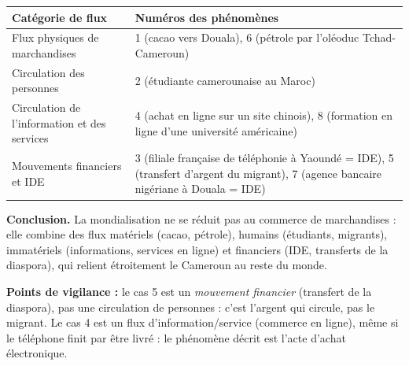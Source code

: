 \documentclass[11pt]{article}
\begin{document}
\begin{corrige}
\begin{center}
\begin{tabularx}{\linewidth}{|l|X|}\hline
\rowcolor{popblueL} \textbf{Catégorie de flux} & \textbf{Numéros des phénomènes} \\ \hline
Flux physiques de marchandises & 1 (cacao vers Douala), 6 (pétrole par l'oléoduc Tchad-Cameroun) \\ \hline
Circulation des personnes & 2 (étudiante camerounaise au Maroc) \\ \hline
Circulation de l'information et des services & 4 (achat en ligne sur un site chinois), 8 (formation en ligne d'une université américaine) \\ \hline
Mouvements financiers et IDE & 3 (filiale française de téléphonie à Yaoundé = IDE), 5 (transfert d'argent du migrant), 7 (agence bancaire nigériane à Douala = IDE) \\ \hline
\end{tabularx}
\end{center}
\textbf{Conclusion.} La mondialisation ne se réduit pas au commerce de marchandises : elle combine des flux matériels (cacao, pétrole), humains (étudiants, migrants), immatériels (informations, services en ligne) et financiers (IDE, transferts de la diaspora), qui relient étroitement le Cameroun au reste du monde.

\textbf{Points de vigilance :} le cas 5 est un \emph{mouvement financier} (transfert de la diaspora), pas une circulation de personnes : c'est l'argent qui circule, pas le migrant. Le cas 4 est un flux d'information/service (commerce en ligne), même si le téléphone finit par être livré : le phénomène décrit est l'acte d'achat électronique.
\end{corrige}
\end{document}
